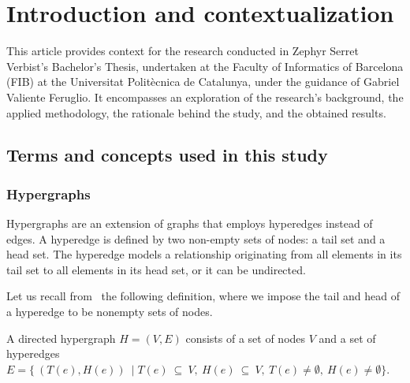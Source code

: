 

\section{Introduction and contextualization}\label{sec:context}
This article provides context for the research conducted in Zephyr Serret Verbist's Bachelor's Thesis, undertaken at the Faculty of Informatics of Barcelona (FIB) at the Universitat Politècnica de Catalunya, under the guidance of Gabriel Valiente Feruglio. It encompasses an exploration of the research's background, the applied methodology, the rationale behind the study, and the obtained results.

\subsection{Terms and concepts used in this study}

\subsubsection{Hypergraphs}

Hypergraphs are an extension of graphs that employs hyperedges instead of edges. A hyperedge is defined by two non-empty sets of nodes: a tail set and a head set. The hyperedge models a relationship originating from all elements in its tail set to all elements in its head set, or it can be undirected.

Let us recall from~\cite{Gallo.Longo.Pallottino.Nguyen:1993} the following definition, where we impose the tail and head of a hyperedge to be nonempty sets of nodes.

\begin{defn}
A directed hypergraph $H=(V,E)$ consists of a set of nodes $V$ and a set of hyperedges $E=\{\ (T(e),H(e))\ \mid T(e)\ \subseteq\ V,\ H(e)\ \subseteq\ V,\ T(e)\neq\emptyset,\ H(e)\neq\emptyset\}$.
\end{defn}

